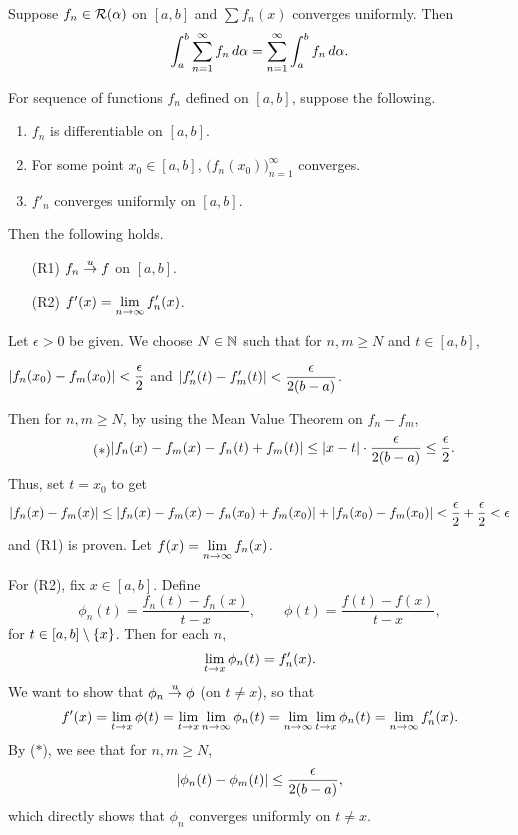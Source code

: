 \cor Suppose \(f_n \in \mathcal{R}(\alpha)\) on \([a, b]\) and \(\sum f_n(x)\) converges uniformly. Then
\[
    \int_a^b \sum_{n=1}^\infty f_n \,d{\alpha} = \sum_{n=1}^\infty \int_a^b f_n \,d{\alpha}.
\]

 For sequence of functions \(f_n\) defined on \([a, b]\), suppose the following.
\begin{enumerate}
    \item \(f_n\) is differentiable on \([a, b]\).
    \item For some point \(x_0 \in [a, b]\), \(\bigl(f_n(x_0)\bigr)_{n=1}^\infty\) converges.
    \item \(f'_n\) converges uniformly on \([a, b]\).
\end{enumerate}
Then the following holds.
\begin{enumerate}
    \item[(R1)] \(f_n \overset{u}{\rightarrow} f\) on \([a, b]\).
    \item[(R2)] \(f'(x) = \displaystyle \lim_{n \rightarrow \infty} f'_n(x)\).
\end{enumerate}

\pf Let \(\epsilon > 0\) be given. We choose \(N \in \mathbb{N}\) such that for \(n, m \geq N\) and \(t \in [a, b]\),
\begin{center}
    \(\left| f_n(x_0) - f_m(x_0) \right| < \dfrac{\epsilon}{2}\) and \(\left| f'_n(t) - f'_m(t) \right| < \dfrac{\epsilon}{2(b-a)}\).
\end{center}
Then for \(n, m \geq N\), by using the Mean Value Theorem on \(f_n - f_m\),
\begin{equation} \tag{\(\ast\)}
    \begin{aligned}
        \left| f_n(x) - f_m(x) - f_n(t) + f_m(t) \right| \leq \left| x - t \right| \cdot \frac{\epsilon}{2(b - a)} \leq \frac{\epsilon}{2}.
    \end{aligned}
\end{equation}
Thus, set \(t = x_0\) to get
\[
    \left| f_n(x) - f_m(x) \right| \leq \left| f_n(x) - f_m(x) - f_n(x_0) + f_m(x_0) \right| + \left| f_n(x_0) - f_m(x_0) \right| < \dfrac{\epsilon}{2} + \dfrac{\epsilon}{2} < \epsilon
\] and (R1) is proven. Let \(f(x) = \displaystyle \lim_{n \rightarrow \infty} f_n(x)\).

For (R2), fix \(x \in [a, b]\). Define
\[
    \phi_n(t) = \frac{f_n(t) - f_n(x)}{t - x}, \qquad \phi(t) = \frac{f(t) - f(x)}{t - x},
\]
for \(t \in [a, b] \setminus \{x\}\). Then for each \(n\),
\[
    \lim_{t \rightarrow x} \phi_n(t) = f'_n(x).
\]
We want to show that \(\phi_n \overset{u}{\rightarrow} \phi\) (on \(t \neq x\)), so that
\[
    f'(x) = \lim_{t \rightarrow x} \phi(t) = \lim_{t \rightarrow x} \lim_{n \rightarrow\infty}\phi_n (t) = \lim_{n \rightarrow\infty} \lim_{t \rightarrow x} \phi_n(t) = \lim_{n\rightarrow\infty} f'_n(x).
\]
By (\(\ast\)), we see that for \(n, m \geq N\),
\[
    \left| \phi_n(t) - \phi_m(t) \right| \leq \frac{\epsilon}{2(b-a)},
\]
which directly shows that \(\phi_n\) converges uniformly on \(t \neq x\).

